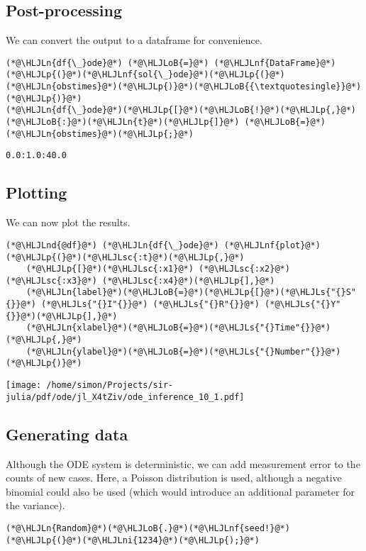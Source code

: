 \documentclass[12pt,a4paper]{article}
\newcommand{\HLJLn}[1]{#1}
\newcommand{\HLJLnd}[1]{\textcolor[RGB]{214,102,97}{#1}}
\newcommand{\HLJLnf}[1]{\textcolor[RGB]{66,102,213}{#1}}
\newcommand{\HLJLs}[1]{\textcolor[RGB]{201,61,57}{#1}}
\newcommand{\HLJLsc}[1]{\textcolor[RGB]{201,61,57}{#1}}
\newcommand{\HLJLni}[1]{\textcolor[RGB]{59,151,46}{#1}}
\newcommand{\HLJLoB}[1]{\textcolor[RGB]{102,102,102}{\textbf{#1}}}
\newcommand{\HLJLp}[1]{#1}
\begin{document}
\subsection{Post-processing}
We can convert the output to a dataframe for convenience.


\begin{lstlisting}
(*@\HLJLn{df{\_}ode}@*) (*@\HLJLoB{=}@*) (*@\HLJLnf{DataFrame}@*)(*@\HLJLp{(}@*)(*@\HLJLnf{sol{\_}ode}@*)(*@\HLJLp{(}@*)(*@\HLJLn{obstimes}@*)(*@\HLJLp{)}@*)(*@\HLJLoB{{\textquotesingle}}@*)(*@\HLJLp{)}@*)
(*@\HLJLn{df{\_}ode}@*)(*@\HLJLp{[}@*)(*@\HLJLoB{!}@*)(*@\HLJLp{,}@*)(*@\HLJLoB{:}@*)(*@\HLJLn{t}@*)(*@\HLJLp{]}@*) (*@\HLJLoB{=}@*) (*@\HLJLn{obstimes}@*)(*@\HLJLp{;}@*)
\end{lstlisting}

\begin{lstlisting}
0.0:1.0:40.0
\end{lstlisting}


\subsection{Plotting}
We can now plot the results.


\begin{lstlisting}
(*@\HLJLnd{@df}@*) (*@\HLJLn{df{\_}ode}@*) (*@\HLJLnf{plot}@*)(*@\HLJLp{(}@*)(*@\HLJLsc{:t}@*)(*@\HLJLp{,}@*)
    (*@\HLJLp{[}@*)(*@\HLJLsc{:x1}@*) (*@\HLJLsc{:x2}@*) (*@\HLJLsc{:x3}@*) (*@\HLJLsc{:x4}@*)(*@\HLJLp{],}@*)
    (*@\HLJLn{label}@*)(*@\HLJLoB{=}@*)(*@\HLJLp{[}@*)(*@\HLJLs{"{}S"{}}@*) (*@\HLJLs{"{}I"{}}@*) (*@\HLJLs{"{}R"{}}@*) (*@\HLJLs{"{}Y"{}}@*)(*@\HLJLp{],}@*)
    (*@\HLJLn{xlabel}@*)(*@\HLJLoB{=}@*)(*@\HLJLs{"{}Time"{}}@*)(*@\HLJLp{,}@*)
    (*@\HLJLn{ylabel}@*)(*@\HLJLoB{=}@*)(*@\HLJLs{"{}Number"{}}@*)(*@\HLJLp{)}@*)
\end{lstlisting}

\texttt{[image: /home/simon/Projects/sir-julia/pdf/ode/jl\_X4tZiv/ode\_inference\_10\_1.pdf]}

\subsection{Generating data}
Although the ODE system is deterministic, we can add measurement error to the counts of new cases. Here, a Poisson distribution is used, although a negative binomial could also be used (which would introduce an additional parameter for the variance).


\begin{lstlisting}
(*@\HLJLn{Random}@*)(*@\HLJLoB{.}@*)(*@\HLJLnf{seed!}@*)(*@\HLJLp{(}@*)(*@\HLJLni{1234}@*)(*@\HLJLp{);}@*)
\end{lstlisting}
\end{document}
